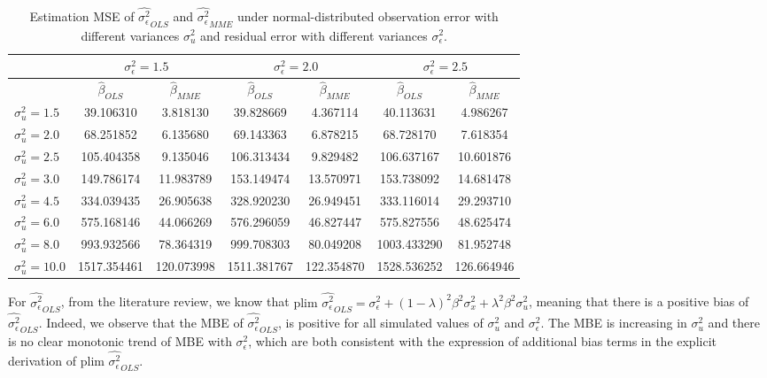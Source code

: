 \documentclass{article}
\begin{document}
\begin{table}[ht]
    \centering
    \caption{Estimation MSE of $\hat{\sigma^2_\epsilon}_{OLS}$ and $\hat{\sigma^2_\epsilon}_{MME}$ under normal-distributed observation error with different variances $\sigma^2_u$ and residual error with different variances $\sigma^2_\epsilon$.}
    \label{Tab:MSE_sigma_t}
    \begin{tabular}[t]{lcccccc}
        \hline
        &\multicolumn{2}{c}{$\sigma^2_\epsilon=1.5$}&\multicolumn{2}{c}{$\sigma^2_\epsilon=2.0$}&\multicolumn{2}{c}{$\sigma^2_\epsilon=2.5$}\\
        \hline
        &$\hat{\beta}_{OLS}$&$\hat{\beta}_{MME}$&$\hat{\beta}_{OLS}$&$\hat{\beta}_{MME}$&$\hat{\beta}_{OLS}$&$\hat{\beta}_{MME}$\\
        \hline
        $\sigma^2_u = 1.5$&39.106310&3.818130&39.828669&4.367114&40.113631&4.986267\\
        $\sigma^2_u = 2.0$&68.251852&6.135680&69.143363&6.878215&68.728170&7.618354\\
        $\sigma^2_u = 2.5$&105.404358&9.135046&106.313434&9.829482&106.637167&10.601876\\
        $\sigma^2_u = 3.0$&149.786174&11.983789&153.149474&13.570971&153.738092&14.681478\\
        $\sigma^2_u = 4.5$&334.039435&26.905638&328.920230&26.949451&333.116014&29.293710\\
        $\sigma^2_u = 6.0$&575.168146&44.066269&576.296059&46.827447&575.827556&48.625474\\
        $\sigma^2_u = 8.0$&993.932566&78.364319&999.708303&80.049208&1003.433290&81.952748\\
        $\sigma^2_u = 10.0$&1517.354461&120.073998&1511.381767&122.354870&1528.536252&126.664946\\
    \end{tabular}
\end{table}

For $\hat{\sigma^2_\epsilon}_{OLS}$, from the literature review, we know that $\textrm{plim } \hat{\sigma^2_\epsilon}_{OLS} = \sigma_\epsilon^2 + (1-\lambda)^2 \beta^2 \sigma_x^2 + \lambda^2 \beta^2 \sigma_u^2$, meaning that there is a positive bias of $\hat{\sigma^2_\epsilon}_{OLS}$. 
Indeed, we observe that the MBE of $\hat{\sigma^2_\epsilon}_{OLS}$, is positive for all simulated values of $\sigma^2_u$ and $\sigma^2_\epsilon$.
The MBE is increasing in $\sigma^2_u$ and there is no clear monotonic trend of MBE with $\sigma^2_\epsilon$, which are both consistent with the expression of additional bias terms in the explicit derivation of $\textrm{plim } \hat{\sigma^2_\epsilon}_{OLS}$.
\end{document}
